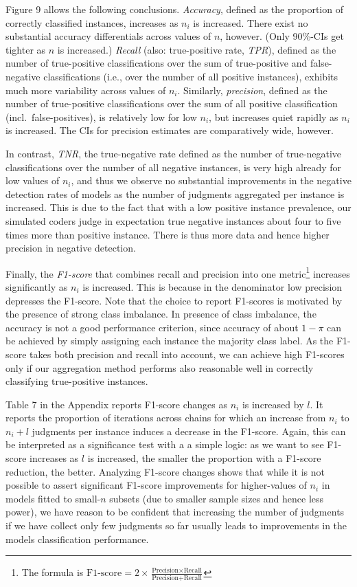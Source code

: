 \documentclass[12pt,]{article}
\begin{document}
Figure 9 allows the following conclusions. \emph{Accuracy}, defined as
the proportion of correctly classified instances, increases as \(n_i\)
is increased. There exist no substantial accuracy differentials across
values of \(n\), however. (Only 90\%-CIs get tighter as \(n\) is
increased.) \emph{Recall} (also: true-positive rate, \emph{TPR}),
defined as the number of true-positive classifications over the sum of
true-positive and false-negative classifications (i.e., over the number
of all positive instances), exhibits much more variability across values
of \(n_i\). Similarly, \emph{precision}, defined as the number of
true-positive classifications over the sum of all positive
classification (incl.~false-positives), is relatively low for low
\(n_i\), but increases quiet rapidly as \(n_i\) is increased. The CIs
for precision estimates are comparatively wide, however.

In contrast, \emph{TNR}, the true-negative rate defined as the number of
true-negative classifications over the number of all negative instances,
is very high already for low values of \(n_i\), and thus we observe no
substantial improvements in the negative detection rates of models as
the number of judgments aggregated per instance is increased. This is
due to the fact that with a low positive instance prevalence, our
simulated coders judge in expectation true negative instances about four
to five times more than positive instance. There is thus more data and
hence higher precision in negative detection.

Finally, the \emph{F1-score} that combines recall and precision into one
metric\footnote{The formula is
  \(\text{F1-score} = 2\times\frac{\text{Precision}\times \text{Recall}}{\text{Precision} + \text{Recall}}\)}
increases significantly as \(n_i\) is increased. This is because in the
denominator low precision depresses the F1-score. Note that the choice
to report F1-scores is motivated by the presence of strong class
imbalance. In presence of class imbalance, the accuracy is not a good
performance criterion, since accuracy of about \(1-\pi\) can be achieved
by simply assigning each instance the majority class label. As the
F1-score takes both precision and recall into account, we can achieve
high F1-scores only if our aggregation method performs also reasonable
well in correctly classifying true-positive instances.

Table 7 in the Appendix reports F1-score changes as \(n_i\) is increased
by \(l\). It reports the proportion of iterations across chains for
which an increase from \(n_i\) to \(n_i+l\) judgments per instance
induces a decrease in the F1-score. Again, this can be interpreted as a
significance test with a a simple logic: as we want to see F1-score
increases as \(l\) is increased, the smaller the proportion with a
F1-score reduction, the better. Analyzing F1-score changes shows that
while it is not possible to assert significant F1-score improvements for
higher-values of \(n_i\) in models fitted to small-\(n\) subsets (due to
smaller sample sizes and hence less power), we have reason to be
confident that increasing the number of judgments if we have collect
only few judgments so far usually leads to improvements in the models
classification performance.
\end{document}
